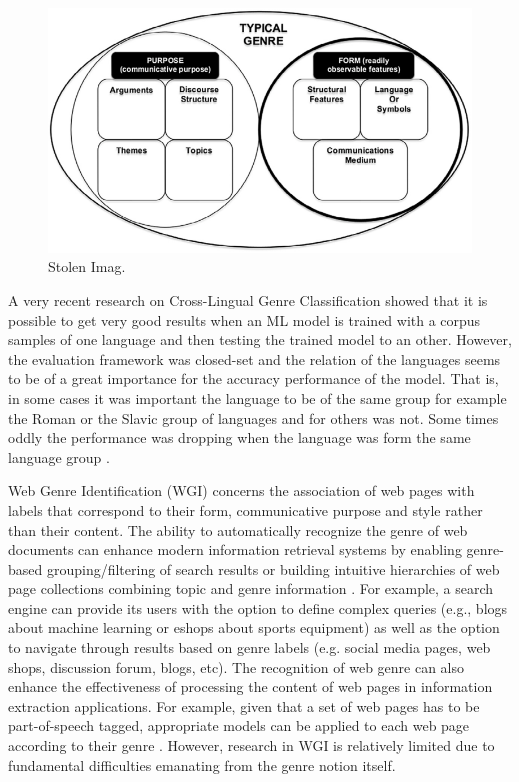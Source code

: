 \begin{figure}[t]
	\begin{center}
    	\includegraphics[scale=0.95]{Figures/Sotlen_diagram.eps}
		\caption{Stolen Imag.}
		\label{fiig:Stolen}
	\end{center}
\end{figure}







A very recent research on Cross-Lingual Genre Classification showed that it is possible to get very good results when an ML model is trained with a corpus samples of one language and then testing the trained model to an other. However, the evaluation framework was closed-set and the relation of the languages seems to be of a great importance for the accuracy performance of the model. That is, in some cases it was important the language to be of the same group for example the Roman or the Slavic group of languages and for others was not. Some times oddly the performance was dropping when the language was form the same language group \parencite{nguyen2019cross}.

Web Genre Identification (WGI) concerns the association of web pages with labels that correspond to their form, communicative purpose and style rather than their content. The ability to automatically recognize the genre of web documents can enhance modern information retrieval systems by enabling genre-based grouping/filtering of search results or building intuitive hierarchies of web page collections combining topic and genre information \parencite{Braslavski2007,Rosso2008,de2009genre}. For example, a search engine can provide its users with the option to define complex queries (e.g., blogs about machine learning or eshops about sports equipment) as well as the option to navigate through results based on genre labels (e.g. social media pages, web shops, discussion forum, blogs, etc). The recognition of web genre can also enhance the effectiveness of processing the content of web pages in information extraction applications. For example, given that a set of web pages has to be part-of-speech tagged, appropriate models can be applied to each web page according to their genre \parencite{Nooralahzadeh2014}. However, research in WGI is relatively limited due to fundamental difficulties emanating from the genre notion itself.


